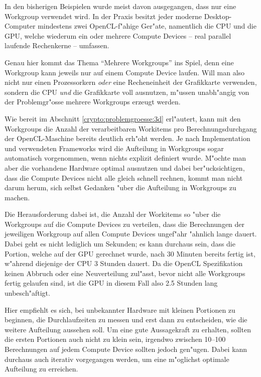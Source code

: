 \begin{refsection}
In den bisherigen Beispielen wurde meist davon ausgegangen, dass nur eine
Workgroup verwendet wird. In der Praxis besitzt jeder moderne Desktop-Computer
mindestens zwei OpenCL-f"ahige Ger"ate, namentlich die CPU und die GPU, welche
wiederum ein oder mehrere Compute Devices -- real parallel laufende Rechenkerne
-- umfassen.

Genau hier kommt das Thema ``Mehrere Workgroups'' ins Spiel, denn eine Workgroup
kann jeweils nur auf einem Compute Device laufen. Will man also nicht nur einen
Prozessorkern \textit{oder} eine Recheneinheit der Grafikkarte verwenden, sondern
die CPU \textit{und} die Grafikkarte voll ausnutzen, m"ussen unabh"angig von der
Problemgr"osse mehrere Workgroups erzeugt werden.

Wie bereit im Abschnitt \ref{crypto:problemgroesse:3d} erl"autert, kann mit den
Workgroups die Anzahl der verarbeitbaren Workitems pro Berechnungsdurchgang der
OpenCL-Maschine bereits deutlich erh"oht werden. Je nach Implementation und
verwendeten Frameworks wird die Aufteilung in Workgroups sogar automatisch
vorgenommen, wenn nichts explizit definiert wurde. M"ochte man aber die
vorhandene Hardware optimal ausnutzen und dabei ber"ucksichtigen, dass die
Compute Devices nicht alle gleich schnell rechnen, kommt man nicht darum herum,
sich selbst Gedanken "uber die Aufteilung in Workgroups zu machen.

Die Herausforderung dabei ist, die Anzahl der Workitems so "uber die Workgroups
auf die Compute Devices zu verteilen, dass die Berechnungen der jeweiligen
Workgroup auf allen Compute Devices ungef"ahr "ahnlich lange dauert.  Dabei geht
es nicht lediglich um Sekunden; es kann durchaus sein, dass die Portion, welche
auf der GPU gerechnet wurde, nach 30 Minuten bereits fertig ist, w"ahrend
diejenige der CPU 3 Stunden dauert. Da die OpenCL Spezifikation keinen Abbruch
oder eine Neuverteilung zul"asst, bevor nicht alle Workgroups fertig gelaufen
sind, ist die GPU in diesem Fall also 2.5 Stunden lang unbesch"aftigt.

Hier empfiehlt es sich, bei unbekannter Hardware mit kleinen Portionen zu
beginnen, die Durchlaufzeiten zu messen und erst dann zu entscheiden, wie die
weitere Aufteilung aussehen soll. Um eine gute Aussagekraft zu erhalten, sollten
die ersten Portionen auch nicht zu klein sein, irgendwo zwischen 10--100
Berechnungen auf jedem Compute Device sollten jedoch gen"ugen. Dabei kann
durchaus auch iterativ vorgegangen werden, um eine m"oglichst optimale
Aufteilung zu erreichen.


\end{refsection}
